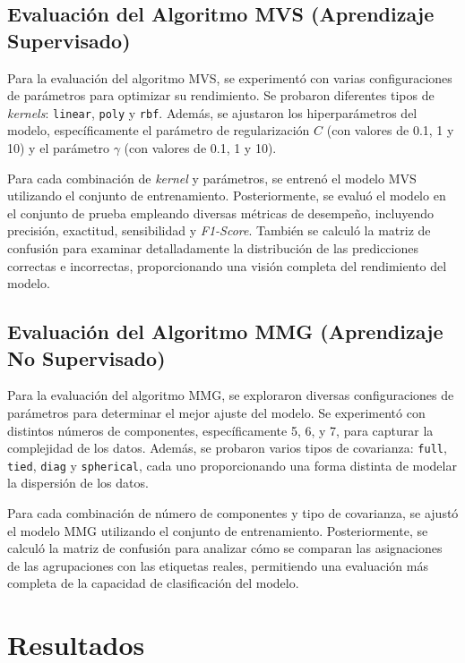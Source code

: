 \documentclass{esannV2}
\begin{document}
\subsection{Evaluación del Algoritmo MVS (Aprendizaje Supervisado)}

Para la evaluación del algoritmo MVS, se experimentó con varias configuraciones de parámetros para optimizar su rendimiento. Se probaron diferentes tipos de \textit{kernels}: \texttt{linear}, \texttt{poly} y \texttt{rbf}. Además, se ajustaron los hiperparámetros del modelo, específicamente el parámetro de regularización $C$ (con valores de 0.1, 1 y 10) y el parámetro $\gamma$ (con valores de 0.1, 1 y 10).

Para cada combinación de \textit{kernel} y parámetros, se entrenó el modelo MVS utilizando el conjunto de entrenamiento. Posteriormente, se evaluó el modelo en el conjunto de prueba empleando diversas métricas de desempeño, incluyendo precisión, exactitud, sensibilidad y \textit{F1-Score}. También se calculó la matriz de confusión para examinar detalladamente la distribución de las predicciones correctas e incorrectas, proporcionando una visión completa del rendimiento del modelo.

\subsection{Evaluación del Algoritmo MMG (Aprendizaje No Supervisado)}
Para la evaluación del algoritmo MMG, se exploraron diversas configuraciones de parámetros para determinar el mejor ajuste del modelo. Se experimentó con distintos números de componentes, específicamente 5, 6, y 7, para capturar la complejidad de los datos. Además, se probaron varios tipos de covarianza: \texttt{full}, \texttt{tied}, \texttt{diag} y \texttt{spherical}, cada uno proporcionando una forma distinta de modelar la dispersión de los datos.

Para cada combinación de número de componentes y tipo de covarianza, se ajustó el modelo MMG utilizando el conjunto de entrenamiento. Posteriormente, se calculó la matriz de confusión para analizar cómo se comparan las asignaciones de las agrupaciones con las etiquetas reales, permitiendo una evaluación más completa de la capacidad de clasificación del modelo.


\section{Resultados}
\end{document}
